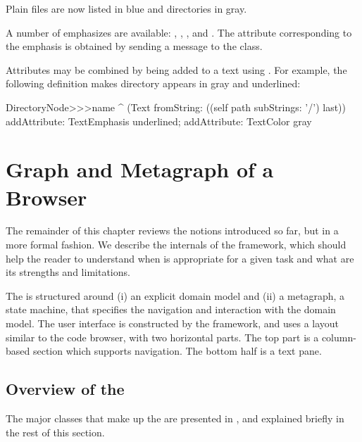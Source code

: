 \documentclass[a4paper,10pt,twoside]{book}
\begin{document}
Plain files are now listed in blue and directories in gray.

A number of emphasizes are available: , , , and . The attribute corresponding to the emphasis is obtained by sending a message to the  class.

Attributes may be combined by being added to a text using . For example, the following  definition makes directory appears in gray and underlined:

\begin{code}{}
DirectoryNode>>>name
	^ (Text fromString: ((self path subStrings: '/') last))
		addAttribute: TextEmphasis underlined;
		addAttribute: TextColor gray
\end{code}

\section{Graph and Metagraph of a Browser} 

The remainder of this chapter reviews the notions introduced so far, but in a more formal fashion. We describe the internals of the framework, which should help the reader to understand when \ob is appropriate for a given task and what are its strengths and limitations.

The \obf is structured around (i) an explicit domain model and (ii) a metagraph, a state machine, that specifies the navigation and interaction with the domain model. The user interface is constructed by the framework, and uses a layout similar to the code browser, with two horizontal parts. The top part is a column-based section which supports navigation. The bottom half is a text pane.


\subsection{Overview of the \obf}
The major classes that make up the \obf are presented in , and explained briefly in the rest of this section. %
\end{document}
